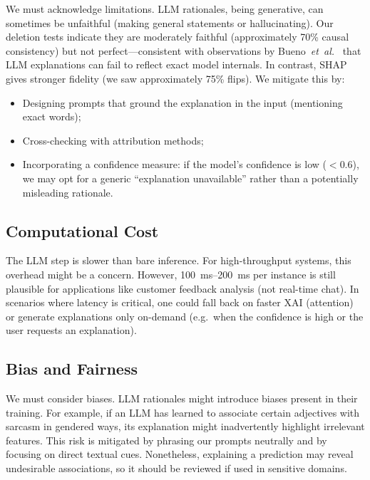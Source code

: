 We must acknowledge limitations. LLM rationales, being generative, can sometimes be unfaithful (making general statements or hallucinating). Our deletion tests indicate they are moderately faithful (approximately 70\% causal consistency) but not perfect---consistent with observations by Bueno~\emph{et~al.}~\cite{bueno2026scoring} that LLM explanations can fail to reflect exact model internals. In contrast, SHAP gives stronger fidelity (we saw approximately 75\% flips). We mitigate this by:

\begin{itemize}[leftmargin=*]
    \item Designing prompts that ground the explanation in the input (mentioning exact words);
    \item Cross-checking with attribution methods;
    \item Incorporating a confidence measure: if the model's confidence is low ($< 0.6$), we may opt for a generic ``explanation unavailable'' rather than a potentially misleading rationale.
\end{itemize}

\subsection{Computational Cost}\label{subsec:disc_cost}

The LLM step is slower than bare inference. For high-throughput systems, this overhead might be a concern. However, \SIrange{100}{200}{\milli\second} per instance is still plausible for applications like customer feedback analysis (not real-time chat). In scenarios where latency is critical, one could fall back on faster XAI (attention) or generate explanations only on-demand (e.g.\ when the confidence is high or the user requests an explanation).

\subsection{Bias and Fairness}\label{subsec:disc_bias}

We must consider biases. LLM rationales might introduce biases present in their training. For example, if an LLM has learned to associate certain adjectives with sarcasm in gendered ways, its explanation might inadvertently highlight irrelevant features. This risk is mitigated by phrasing our prompts neutrally and by focusing on direct textual cues. Nonetheless, explaining a prediction may reveal undesirable associations, so it should be reviewed if used in sensitive domains.

